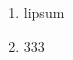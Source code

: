 \documentclass{ctexbeamer}
\begin{document}
    \begin{frame}
        \begin{enumerate}
            \item lipsum
            \item 333
        \end{enumerate}
    \end{frame}
\end{document}
